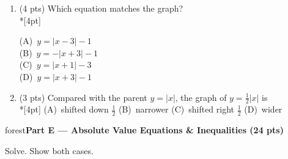 \documentclass[12pt]{article}
\newcommand{\lgrid}[4]{%
  \draw[step=1, linegray!40, very thin] (#1,#3) grid (#2,#4);
  \draw[->, semithick, charcoal] (#1,0)--(#2,0) node[below right, font=\scriptsize]{$x$};
  \draw[->, semithick, charcoal] (0,#3)--(0,#4) node[left, font=\scriptsize]{$y$};}
\newcommand{\parthead}[1]{%
  \boxguard[10]\vspace{6pt}\noindent
  \begin{headlinebox}{forest}\color{white}\bfseries #1\end{headlinebox}%
  \vspace{4pt}}
\newcommand{\opt}[2]{(#1)~#2}
\newcommand{\optok}[2]{(#1)~#2}
\begin{document}
\begin{enumerate}[leftmargin=1.9em, itemsep=10pt, label=\arabic*., start=15]
  \item {}(4 pts) Which equation matches the graph?
    \\*[4pt]
    \begin{minipage}[c]{0.36\linewidth}\centering
    \end{minipage}%
    \begin{minipage}[c]{0.6\linewidth}
    \opt{A}{$y=|x-3|-1$} \\[6pt]
    \opt{B}{$y=-|x+3|-1$} \\[6pt]
    \opt{C}{$y=|x+1|-3$} \\[6pt]
    \optok{D}{$y=|x+3|-1$}
    \end{minipage}

  \item {}(3 pts) Compared with the parent $y=|x|$, the graph of $y=\tfrac{1}{2}|x|$ is
    \\*[4pt]
    \opt{A}{shifted down $\tfrac{1}{2}$} \hfill \opt{B}{narrower} \hfill
    \opt{C}{shifted right $\tfrac{1}{2}$} \hfill \optok{D}{wider}
\end{enumerate}

\parthead{Part E --- Absolute Value Equations \& Inequalities (24 pts)}
Solve. Show both cases.
\end{document}
